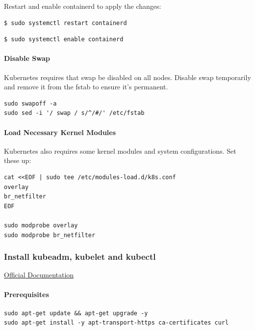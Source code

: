 \documentclass{article}
\newenvironment{codetemplate}[1][]{%
  \mybasecolorbox[#1]
  \itshape
}{%
  \endmybasecolorbox
}
\begin{document}
Restart and enable containerd to apply the changes:
\begin{codetemplate}{}
\begin{verbatim}
$ sudo systemctl restart containerd
\end{verbatim}
\end{codetemplate}
\begin{codetemplate}{}
\begin{verbatim}
$ sudo systemctl enable containerd
\end{verbatim}
\end{codetemplate}

\paragraph{Disable Swap}
Kubernetes requires that swap be disabled on all nodes. Disable swap temporarily and remove it from the fstab to ensure it's permanent.

\begin{codetemplate}{}
\begin{verbatim}
sudo swapoff -a
sudo sed -i '/ swap / s/^/#/' /etc/fstab
\end{verbatim}
\end{codetemplate}

\paragraph{Load Necessary Kernel Modules}
Kubernetes also requires some kernel modules and system configurations. Set these up:
\begin{codetemplate}{}
\begin{verbatim}
cat <<EOF | sudo tee /etc/modules-load.d/k8s.conf
overlay
br_netfilter
EOF

sudo modprobe overlay
sudo modprobe br_netfilter
\end{verbatim}
\end{codetemplate}

\subsubsection{Install kubeadm, kubelet and kubectl}

\href{https://kubernetes.io/docs/setup/production-environment/tools/kubeadm/install-kubeadm/}{Official Documentation}

\paragraph{Prerequisites}
\begin{codetemplate}{}
\begin{verbatim}
sudo apt-get update && apt-get upgrade -y
sudo apt-get install -y apt-transport-https ca-certificates curl
\end{verbatim}
\end{codetemplate}
\end{document}
